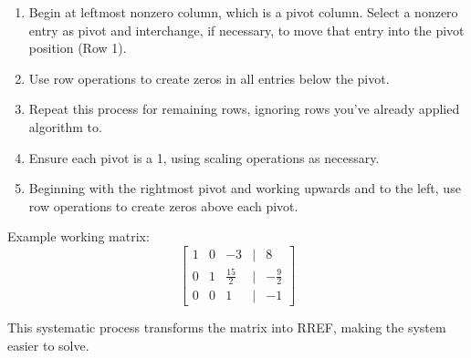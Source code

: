 \documentclass{article}
\begin{document}
\begin{enumerate}
    \item Begin at leftmost nonzero column, which is a pivot column. Select a nonzero entry as pivot and interchange, if necessary, to move that entry into the pivot position (Row 1).
    
    \item Use row operations to create zeros in all entries below the pivot.
    
    \item Repeat this process for remaining rows, ignoring rows you've already applied algorithm to.
    
    \item Ensure each pivot is a 1, using scaling operations as necessary.
    
    \item Beginning with the rightmost pivot and working upwards and to the left, use row operations to create zeros above each pivot.
\end{enumerate}

Example working matrix:
\[
\begin{bmatrix}
1 & 0 & -3 & | & 8 \\
0 & 1 & \frac{15}{2} & | & -\frac{9}{2} \\
0 & 0 & 1 & | & -1
\end{bmatrix}
\]

This systematic process transforms the matrix into RREF, making the system easier to solve.
\end{document}

